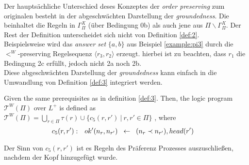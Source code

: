 Der hauptsächliche Unterschied deses Konzeptes der \emph{order preserving} zum
originalen besteht in der abgeschwächten Darstellung der \emph{groundedness}.
Die beinhaltet die Regeln in $\Gamma^{X}_{\Pi}$ (über Bedingung 0b) als auch jene
aus $\Pi \backslash \Gamma^{X}_{\Pi}$. Der Rest der Definition unterscheidet sich
nicht von Definition \ref{def:2}.\\
Beispielsweise wird das \emph{answer set} $\{a, b\}$ aus Beispiel
\ref{example:pi3} durch die $<^W$-preserving Regelsequenz
$\langle r_3, r_2 \rangle$ erzeugt. hierbei ist zu beachten, dass $r_1$ die
Bedingung 2c erfüllt, jedoch nicht 2a noch 2b.\\
Diese abgeschwächten Darstellung der \emph{groundedness} kann einfach in die
Umwandlung von Definition \ref{def:3} integriert werden.

\begin{definition}
  Given the same prerequisites as in definition \ref{def:3}.
  Then, the logic program $\mathcal{T}^W(\Pi)$ over $L^+$ is defined as\\
  $\mathcal{T}^W(\Pi) = \bigcup_{r \in \Pi}\tau(r) \cup \{c_5(r, r')~|~r, r' \in \Pi\}$
  , where
    \begin{align*}
      c_5(r, r'): && ok'(n_r, n_{r'}) \hspace*{0.2cm}&\leftarrow \hspace*{0.2cm} (n_r \prec n_{r'}), head(r')
    \end{align*}
\end{definition}

Der Sinn von $c_5(r, r')$ ist es Regeln des Präferenz Prozesses auszuschließen,
nachdem der Kopf hinzugefügt wurde.
